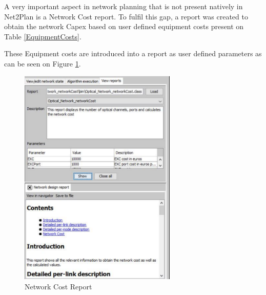 	A very important aspect in network planning that is not present natively in Net2Plan is a Network Cost report. To fulfil this gap, a report was created to obtain the network Capex based on user defined equipment costs present on Table \ref{EquipmentCosts}.
		
	\begin{table} [h]
		\centering
		\caption{Equipment Costs}			
		\label{EquipmentCosts}			
	\end{table}
	
	These Equipment costs are introduced into a report as user defined parameters as can be seen on Figure \ref{networkCost_Report}.
	
	\begin{figure}[h!]
		\centering
		\includegraphics[width=7.5cm]{networkCost_Report.pdf}
		\caption{Network Cost Report}
		\label{networkCost_Report}
	\end{figure}	
	
